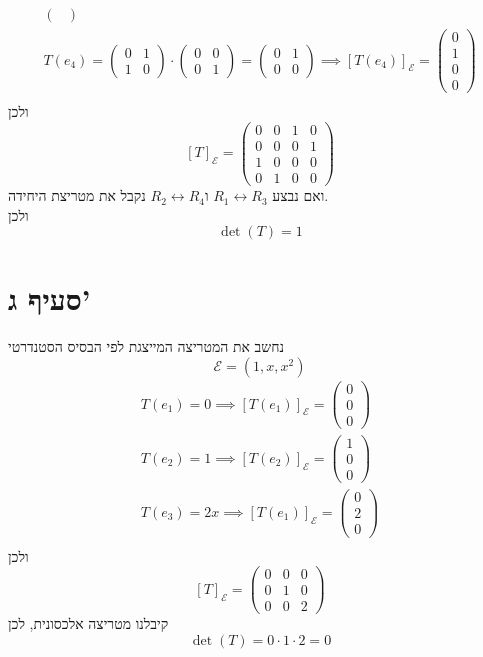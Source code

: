 \documentclass[12pt, titlepage]{article}
\begin{document}
\begin{gather*}
\begin{pmatrix}
    \end{pmatrix} \\ 
 T\left(e_4\right) = \begin{pmatrix}
        0 & 1 \\ 1 & 0
        \end{pmatrix} \cdot \begin{pmatrix}
        0 & 0 \\ 0 & 1
    \end{pmatrix} = \begin{pmatrix}
        0 & 1 \\ 0 & 0
    \end{pmatrix} \implies \left[T\left(e_4\right)\right]_\mathcal{E}  = \begin{pmatrix}
        0\\1\\0\\0
    \end{pmatrix} \\ 
\end{gather*}
ולכן
\[
    \left[T\right]_\mathcal{E} = \begin{pmatrix}
        0 & 0 & 1 & 0\\
        0 & 0 & 0 & 1 \\
        1 & 0 & 0 & 0 \\
        0 & 1 & 0 & 0
    \end{pmatrix}
\]
ואם נבצע $R_1\leftrightarrow R_3$ ו$R_2\leftrightarrow R_4$ נקבל את מטריצת היחידה.\\
ולכן
\[
    \boxed{\det\left(T\right) = 1}
\]
\section*{סעיף ג'}
נחשב את המטריצה המייצגת
לפי הבסיס הסטנדרטי 
\[
    \mathcal{E} = \left(1,x,x^2\right)
\]
\begin{gather*}
    T\left(e_1\right) = 0 \implies \left[T\left(e_1\right)\right]_\mathcal{E} = \begin{pmatrix} 0\\0\\0\end{pmatrix}\\
    T\left(e_2\right) = 1 \implies \left[T\left(e_2\right)\right]_\mathcal{E} = \begin{pmatrix} 1\\0\\0\end{pmatrix}\\
    T\left(e_3\right) = 2x \implies \left[T\left(e_1\right)\right]_\mathcal{E} = \begin{pmatrix} 0\\2\\0\end{pmatrix}\\
\end{gather*}
ולכן
\[
    \left[T\right]_{\mathcal{E}} = \begin{pmatrix}
        0 & 0 & 0\\ 0& 1 & 0\\0 & 0 & 2
    \end{pmatrix}
\]
קיבלנו מטריצה אלכסונית, לכן
\[
    \boxed{\det\left(T\right) = 0 \cdot 1 \cdot 2 = 0}
\]
\newpage
\end{document}
